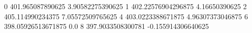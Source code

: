 0 401.965087890625 3.90582275390625
1 402.22576904296875 4.16650390625
2 405.114990234375 7.05572509765625
4 403.0223388671875 4.96307373046875
6 398.05926513671875 0.0
8 397.9033508300781 -0.155914306640625
